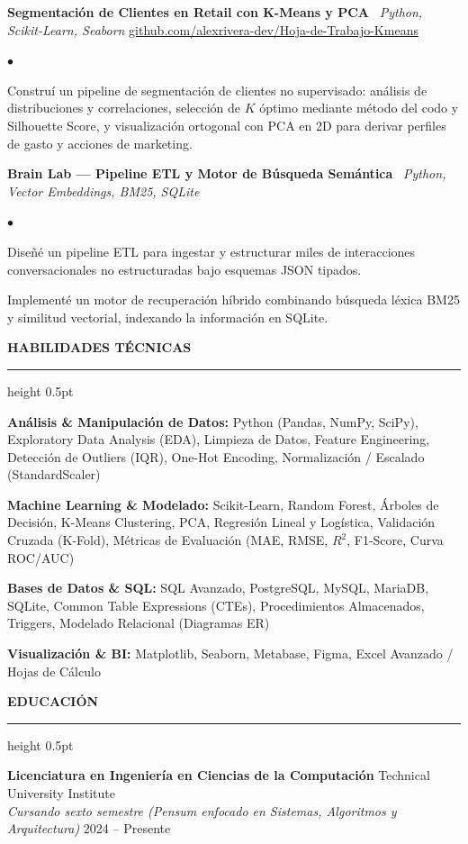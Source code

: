 \documentclass[10pt,letterpaper]{article}
\newcommand{\resumesection}[1]{%
  \vspace{2pt}%
  {\color{primary}\normalsize\bfseries\MakeUppercase{#1}}%
  \vspace{1pt}\hrule height 0.5pt\vspace{2pt}%
}
\renewenvironment{itemize}{%
  \begin{list}{\color{primary}$\bullet$}{%
    \setlength{\leftmargin}{1.1em}%
    \setlength{\itemsep}{0.2pt}%
    \setlength{\topsep}{0.5pt}%
    \setlength{\parsep}{0pt}%
    \setlength{\partopsep}{0pt}%
  }%
}{%
  \end{list}%
}
\newenvironment{skilllist}{%
  \begin{list}{}{%
    \setlength{\leftmargin}{0pt}%
    \setlength{\itemsep}{0.2pt}%
    \setlength{\topsep}{0.5pt}%
    \setlength{\parsep}{0pt}%
    \setlength{\partopsep}{0pt}%
  }%
}{%
  \end{list}%
}
\begin{document}
\vspace{1pt}

\textbf{Segmentación de Clientes en Retail con K-Means y PCA} \textbar\ \textit{Python, Scikit-Learn, Seaborn} \hfill \href{https://github.com/alexrivera-dev/Hoja-de-Trabajo-Kmeans}{github.com/alexrivera-dev/Hoja-de-Trabajo-Kmeans}
\begin{itemize}
    \item Construí un pipeline de segmentación de clientes no supervisado: análisis de distribuciones y correlaciones, selección de $K$ óptimo mediante método del codo y Silhouette Score, y visualización ortogonal con PCA en 2D para derivar perfiles de gasto y acciones de marketing.
\end{itemize}

\vspace{1pt}

\textbf{Brain Lab — Pipeline ETL y Motor de Búsqueda Semántica} \textbar\ \textit{Python, Vector Embeddings, BM25, SQLite}
\begin{itemize}
    \item Diseñé un pipeline ETL para ingestar y estructurar miles de interacciones conversacionales no estructuradas bajo esquemas JSON tipados.
    \item Implementé un motor de recuperación híbrido combinando búsqueda léxica BM25 y similitud vectorial, indexando la información en SQLite.
\end{itemize}

\resumesection{Habilidades Técnicas}
\begin{skilllist}
    \item \textbf{Análisis \& Manipulación de Datos:} Python (Pandas, NumPy, SciPy), Exploratory Data Analysis (EDA), Limpieza de Datos, Feature Engineering, Detección de Outliers (IQR), One-Hot Encoding, Normalización / Escalado (StandardScaler)
    \item \textbf{Machine Learning \& Modelado:} Scikit-Learn, Random Forest, Árboles de Decisión, K-Means Clustering, PCA, Regresión Lineal y Logística, Validación Cruzada (K-Fold), Métricas de Evaluación (MAE, RMSE, $R^2$, F1-Score, Curva ROC/AUC)
    \item \textbf{Bases de Datos \& SQL:} SQL Avanzado, PostgreSQL, MySQL, MariaDB, SQLite, Common Table Expressions (CTEs), Procedimientos Almacenados, Triggers, Modelado Relacional (Diagramas ER)
    \item \textbf{Visualización \& BI:} Matplotlib, Seaborn, Metabase, Figma, Excel Avanzado / Hojas de Cálculo
\end{skilllist}

\resumesection{Educación}
\textbf{Licenciatura en Ingeniería en Ciencias de la Computación} \hfill Technical University Institute \\
\textit{Cursando sexto semestre (Pensum enfocado en Sistemas, Algoritmos y Arquitectura)} \hfill 2024 -- Presente
\end{document}
